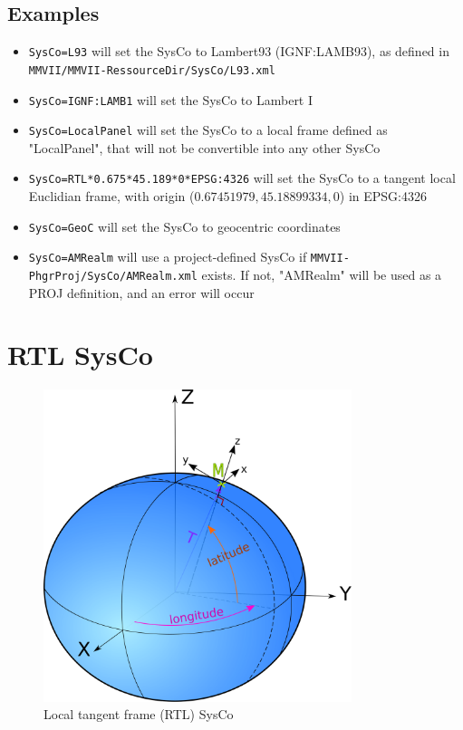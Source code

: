 \subsection{Examples}
\begin{itemize}
\item \texttt{SysCo=L93} will set the SysCo to Lambert93 (IGNF:LAMB93), as defined in \\
\texttt{MMVII/MMVII-RessourceDir/SysCo/L93.xml}
\item \texttt{SysCo=IGNF:LAMB1} will set the SysCo to Lambert I
\item \texttt{SysCo=LocalPanel} will set the SysCo to a local frame defined as "LocalPanel", that will not be convertible into any other SysCo
\item \texttt{SysCo=RTL*0.675*45.189*0*EPSG:4326} will set the SysCo to a tangent local Euclidian frame, with origin ($0.67451979, 45.18899334, 0$) in EPSG:4326
\item \texttt{SysCo=GeoC} will set the SysCo to geocentric coordinates
\item \texttt{SysCo=AMRealm} will use a project-defined SysCo if \texttt{MMVII-PhgrProj/SysCo/AMRealm.xml} exists. If not, "AMRealm" will be used as a PROJ definition, and an error will occur

\end{itemize}


\section{RTL SysCo}
\label{SysCoRTL}

\begin{figure}[h!]
\centering
\includegraphics[width=9cm]{CommandReferences/ImagesComRef/cart_geocentr.png}
\caption{Local tangent frame (RTL) SysCo}
\label{fig:RTL}
\end{figure}


